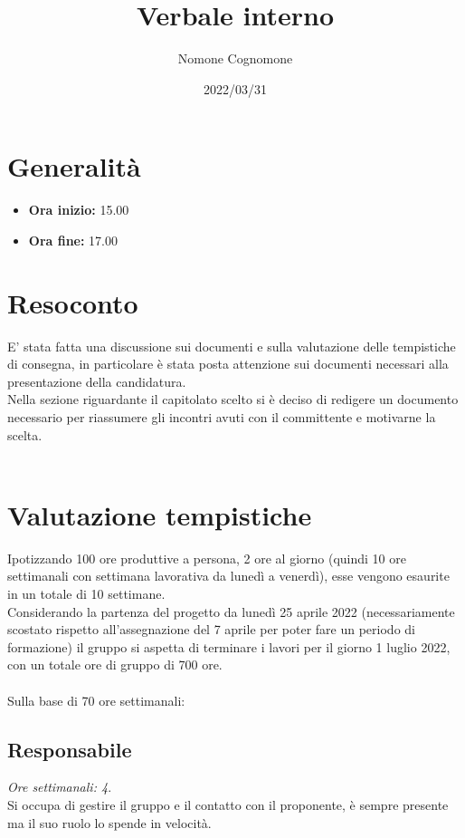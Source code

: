 \documentclass{classes/base}
\title{Verbale interno}
\date{2022/03/31}
\author{Nomone Cognomone}
\renewcommand{\maketitle}{
    
}
\begin{document}
    \maketitle

    \section{Generalità}
    \begin{itemize}
        \item \textbf{Ora inizio:} 15.00
        \item \textbf{Ora fine:} 17.00
    \end{itemize}
    
    \section{Resoconto}
    E' stata fatta una discussione sui documenti e sulla valutazione delle tempistiche di consegna, in particolare è stata posta attenzione sui documenti necessari alla presentazione della candidatura.\\
    Nella sezione riguardante il capitolato scelto si è deciso di redigere un documento necessario per riassumere gli incontri avuti con il committente e motivarne la scelta.\\\\

    \section*{Valutazione tempistiche}
    Ipotizzando 100 ore produttive a persona, 2 ore al giorno (quindi 10 ore settimanali con settimana lavorativa da lunedì a venerdì), esse vengono esaurite in un totale di 10 settimane.\\
    Considerando la partenza del progetto da lunedì 25 aprile 2022 (necessariamente scostato rispetto all'assegnazione del 7 aprile per poter fare un periodo di formazione) il gruppo si aspetta di terminare i lavori per il giorno 1 luglio 2022, con un totale ore di gruppo di 700 ore.\\\\
    Sulla base di 70 ore settimanali:
    \subsection*{Responsabile}
    \textit{Ore settimanali: 4}.\\
    Si occupa di gestire il gruppo e il contatto con il proponente, è sempre presente ma il suo ruolo lo spende in velocità.
\end{document}
